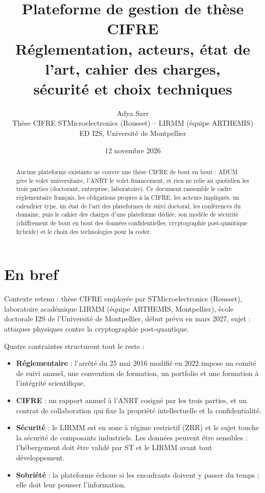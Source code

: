 \documentclass[11pt,a4paper]{article}
\title{\textbf{Plateforme de gestion de thèse CIFRE}\\[4pt]
\large Réglementation, acteurs, état de l'art, cahier des charges,\\
sécurité et choix techniques}
\author{Adya Sarr\\ \small Thèse CIFRE STMicroelectronics (Rousset) -- LIRMM (équipe ARTHEMIS)\\ \small ED I2S, Université de Montpellier}
\date{12 novembre 2026}
\begin{document}
\maketitle
\thispagestyle{empty}

\begin{abstract}
Aucune plateforme existante ne couvre une thèse CIFRE de bout en bout : ADUM gère
le volet universitaire, l'ANRT le volet financement, et rien ne relie au quotidien
les trois parties (doctorant, entreprise, laboratoire). Ce document rassemble le
cadre réglementaire français, les obligations propres à la CIFRE, les acteurs
impliqués, un calendrier type, un état de l'art des plateformes de suivi doctoral,
les conférences du domaine, puis le cahier des charges d'une plateforme dédiée,
son modèle de sécurité (chiffrement de bout en bout des données confidentielles,
cryptographie post-quantique hybride) et le choix des technologies pour la coder.
\end{abstract}

\tableofcontents
\newpage

\section{En bref}

Contexte retenu : thèse CIFRE employée par STMicroelectronics (Rousset),
laboratoire académique LIRMM (équipe ARTHEMIS, Montpellier), école doctorale I2S
de l'Université de Montpellier, début prévu en mars 2027, sujet : attaques
physiques contre la cryptographie post-quantique.

Quatre contraintes structurent tout le reste :
\begin{itemize}
  \item \textbf{Réglementaire} : l'arrêté du 25 mai 2016 modifié en 2022 impose un
  comité de suivi annuel, une convention de formation, un portfolio et une
  formation à l'intégrité scientifique.
  \item \textbf{CIFRE} : un rapport annuel à l'ANRT cosigné par les trois parties,
  et un contrat de collaboration qui fixe la propriété intellectuelle et la
  confidentialité.
  \item \textbf{Sécurité} : le LIRMM est en zone à régime restrictif (ZRR) et le
  sujet touche la sécurité de composants industriels. Les données peuvent être
  sensibles : l'hébergement doit être validé par ST et le LIRMM avant tout
  développement.
  \item \textbf{Sobriété} : la plateforme échoue si les encadrants doivent y passer
  du temps ; elle doit leur pousser l'information.
\end{itemize}
\end{document}
